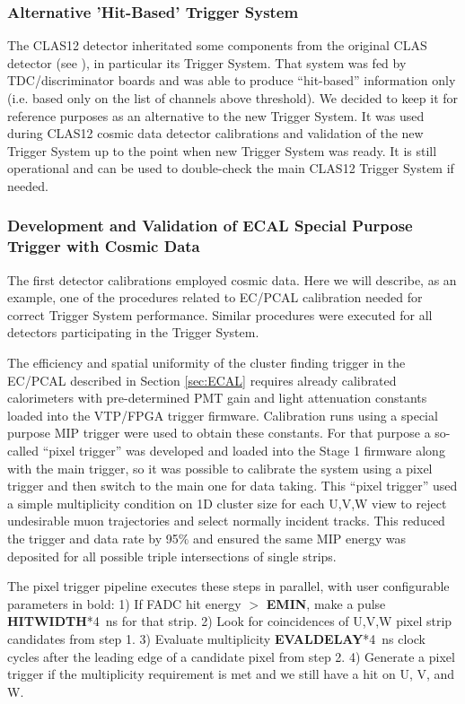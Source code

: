 \subsubsection{Alternative 'Hit-Based' Trigger System}

The CLAS12 detector inheritated some components from the original CLAS detector (see \cite{clas-nim}), in particular its Trigger System. That system was fed by TDC/discriminator boards and was able to produce ``hit-based'' information only (i.e. based only on the list of channels above threshold). We decided to keep it for reference purposes as an alternative to the new Trigger System. It was used during CLAS12 cosmic data detector calibrations and validation of the new Trigger System up to the point when new Trigger System was ready. It is still operational and can be used to double-check the main CLAS12 Trigger System if needed.

\subsubsection{Development and Validation of ECAL Special Purpose Trigger with Cosmic Data}

The first detector calibrations employed cosmic data. Here we will describe, as an example, one of the procedures related to EC/PCAL calibration needed for correct Trigger System performance. Similar procedures were executed for all detectors participating in the Trigger System.

The efficiency and spatial uniformity of the cluster finding trigger in the EC/PCAL described in Section \ref{sec:ECAL} requires already calibrated calorimeters with pre-determined PMT gain and light attenuation constants loaded into the VTP/FPGA trigger firmware.  Calibration runs using a special purpose MIP trigger were used to obtain these constants. For that purpose a so-called ``pixel trigger'' was developed and loaded into the Stage 1 firmware along with the main trigger, so it was possible to calibrate the system using a pixel trigger and then switch to the main one for data taking. This ``pixel trigger'' used a simple multiplicity condition on 1D cluster size for each U,V,W view to reject undesirable muon trajectories and select normally incident tracks.  This reduced the trigger and data rate by 95$\%$ and ensured the same MIP energy was deposited for all possible triple intersections of single strips.

The pixel trigger pipeline executes these steps in parallel, with user configurable parameters in bold:
  1) If FADC hit energy $>$ \textbf{EMIN}, make a pulse \textbf{HITWIDTH}*4~ns for that strip.
  2) Look for coincidences of U,V,W pixel strip candidates from step 1.
  3) Evaluate multiplicity \textbf{EVALDELAY}*4~ns clock cycles after the leading edge of a candidate pixel from step 2.
  4) Generate a pixel trigger if the multiplicity requirement is met and we still have a hit on U, V, and W. 

